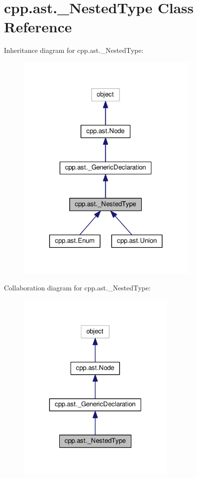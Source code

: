 \hypertarget{classcpp_1_1ast_1_1__NestedType}{}\section{cpp.\+ast.\+\_\+\+Nested\+Type Class Reference}
\label{classcpp_1_1ast_1_1__NestedType}


Inheritance diagram for cpp.\+ast.\+\_\+\+Nested\+Type\+:\nopagebreak
\begin{figure}[H]
\begin{center}
\leavevmode
\includegraphics[width=252pt]{classcpp_1_1ast_1_1__NestedType__inherit__graph}
\end{center}
\end{figure}


Collaboration diagram for cpp.\+ast.\+\_\+\+Nested\+Type\+:\nopagebreak
\begin{figure}[H]
\begin{center}
\leavevmode
\includegraphics[width=220pt]{classcpp_1_1ast_1_1__NestedType__coll__graph}
\end{center}
\end{figure}

